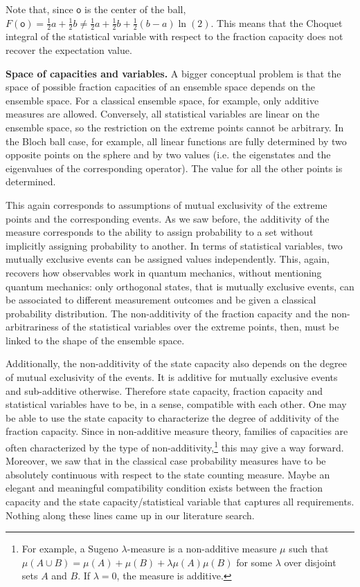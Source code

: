 \documentclass[10pt,twocolumn, nofootinbib]{revtex4-2}
\newcommand{\ens}[1][e] {\mathsf{#1}} %
\begin{document}
Note that, since $\ens[o]$ is the center of the ball, $F(\ens[o]) = \frac{1}{2} a + \frac{1}{2} b \neq \frac{1}{2} a + \frac{1}{2} b + \frac{1}{2}\left(b - a\right)\ln (2)$. This means that the Choquet integral of the statistical variable with respect to the fraction capacity does not recover the expectation value.

\textbf{Space of capacities and variables.} A bigger conceptual problem is that the space of possible fraction capacities of an ensemble space depends on the ensemble space. For a classical ensemble space, for example, only additive measures are allowed. Conversely, all statistical variables are linear on the ensemble space, so the restriction on the extreme points cannot be arbitrary. In the Bloch ball case, for example, all linear functions are fully determined by two opposite points on the sphere and by two values (i.e. the eigenstates and the eigenvalues of the corresponding operator). The value for all the other points is determined.

This again corresponds to assumptions of mutual exclusivity of the extreme points and the corresponding events. As we saw before, the additivity of the measure corresponds to the ability to assign probability to a set without implicitly assigning probability to another. In terms of statistical variables, two mutually exclusive events can be assigned values independently. This, again, recovers how observables work in quantum mechanics, without mentioning quantum mechanics: only orthogonal states, that is mutually exclusive events, can be associated to different measurement outcomes and be given a classical probability distribution. The non-additivity of the fraction capacity and the non-arbitrariness of the statistical variables over the extreme points, then, must be linked to the shape of the ensemble space.

Additionally, the non-additivity of the state capacity also depends on the degree of mutual exclusivity of the events. It is additive for mutually exclusive events and sub-additive otherwise. Therefore state capacity, fraction capacity and statistical variables have to be, in a sense, compatible with each other. One may be able to use the state capacity to characterize the degree of additivity of the fraction capacity. Since in non-additive measure theory, families of capacities are often characterized by the type of non-additivity,\footnote{For example, a Sugeno $\lambda$-measure is a non-additive measure $\mu$ such that $\mu(A \cup B) = \mu(A) + \mu(B) + \lambda \mu(A)\mu(B)$ for some $\lambda$ over disjoint sets $A$ and $B$. If $\lambda = 0$, the measure is additive.} this may give a way forward. Moreover, we saw that in the classical case probability measures have to be absolutely continuous with respect to the state counting measure. Maybe an elegant and meaningful compatibility condition exists between the fraction capacity and the state capacity/statistical variable that captures all requirements. Nothing along these lines came up in our literature search.
\end{document}
